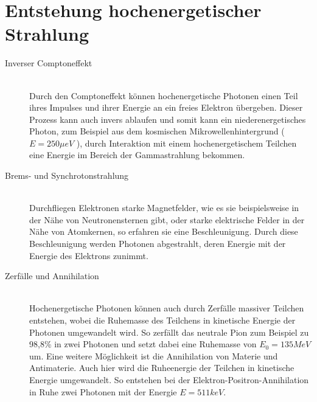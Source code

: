 \section{Entstehung hochenergetischer Strahlung}
\begin{description}
\item[Inverser Comptoneffekt]\hfill \\
Durch den Comptoneffekt können hochenergetische Photonen einen Teil ihres Impulses und ihrer Energie an ein freies Elektron übergeben. Dieser Prozess kann auch invers ablaufen und somit kann ein niederenergetisches Photon, zum Beispiel aus dem kosmischen Mikrowellenhintergrund ($E=250\unit{\mu eV}$ \cite{Grupen}), durch Interaktion mit einem hochenergetischem Teilchen eine Energie im Bereich der Gammastrahlung bekommen.
\item[Brems- und Synchrotonstrahlung]\hfill \\
Durchfliegen Elektronen starke Magnetfelder, wie es sie beispielsweise in der Nähe von Neutronensternen gibt, oder starke elektrische Felder in der Nähe von Atomkernen, so erfahren sie eine Beschleunigung. Durch diese Beschleunigung werden Photonen abgestrahlt, deren Energie mit der Energie des Elektrons zunimmt.
\item[Zerfälle und Annihilation]\hfill \\ 
Hochenergetische Photonen können auch durch Zerfälle massiver Teilchen entstehen, wobei die Ruhemasse des Teilchens in kinetische Energie der Photonen umgewandelt wird. So zerfällt das neutrale Pion zum Beispiel zu 98,8\%  in zwei Photonen und setzt dabei eine Ruhemasse von $E_0=135\unit{MeV}$ \cite{PDG} um. Eine weitere Möglichkeit ist die Annihilation von Materie und Antimaterie. Auch hier wird die Ruheenergie der Teilchen in kinetische Energie umgewandelt. So entstehen bei der Elektron-Positron-Annihilation in Ruhe zwei Photonen mit der Energie $E=511\unit{keV}$.
\end{description}

